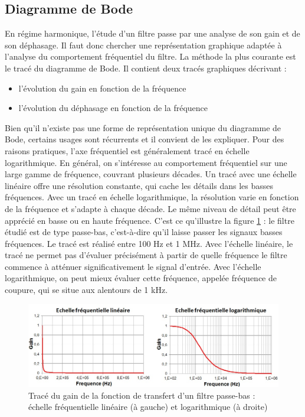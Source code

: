 	\subsection{Diagramme de Bode}
	En régime harmonique, l'étude d'un filtre passe par une analyse de son gain et de son déphasage. Il faut donc chercher une représentation graphique adaptée à l'analyse du comportement fréquentiel du filtre. La méthode la plus courante est le tracé du diagramme de Bode. Il contient deux tracés graphiques décrivant :
	\begin{itemize}
		\item l'évolution du gain en fonction de la fréquence
		\item l'évolution du déphasage en fonction de la fréquence
	\end{itemize}

	\vspace{0.5\baselineskip}

	Bien qu'il n'existe pas une forme de représentation unique du diagramme de Bode, certains usages sont récurrents et il convient de les expliquer. Pour des raisons pratiques, l'axe fréquentiel est généralement tracé en échelle logarithmique. En général, on s'intéresse au comportement fréquentiel sur une large gamme de fréquence, couvrant plusieurs décades. Un tracé avec une échelle linéaire offre une résolution constante, qui cache les détails dans les basses fréquences. Avec un tracé en échelle logarithmique, la résolution varie en fonction de la fréquence et s'adapte à chaque décade. Le même niveau de détail peut être apprécié en basse ou en haute fréquence. C'est ce qu'illustre la figure \ref{Fig:Effet_Flin_log} : le filtre étudié est de type passe-bas, c'est-à-dire qu'il laisse passer les signaux basses fréquences. Le tracé est réalisé entre 100 Hz et 1 MHz. Avec l'échelle linéaire, le tracé ne permet pas d'évaluer précisément à partir de quelle fréquence le filtre commence à atténuer significativement le signal d'entrée. Avec l'échelle logarithmique, on peut mieux évaluer cette fréquence, appelée fréquence de coupure, qui se situe aux alentours de 1 kHz.
	\begin{figure}[h]
		\centering
		\includegraphics[scale=0.6]{images/Effet_Flin_log.jpg}
		\caption{Tracé du gain de la fonction de transfert d'un filtre passe-bas : échelle fréquentielle linéaire (à gauche) et logarithmique (à droite)}	
		\label{Fig:Effet_Flin_log} 
	\end{figure}
	
